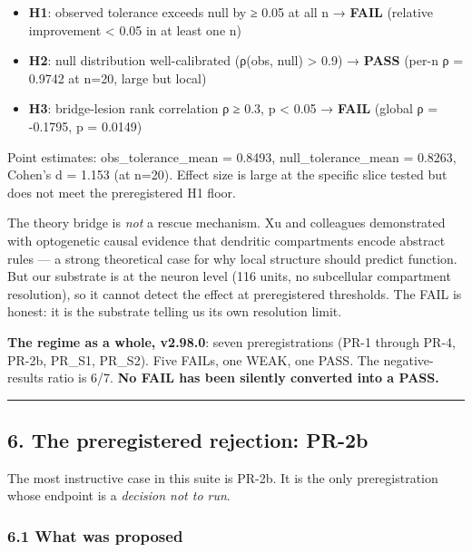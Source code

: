 \documentclass[
]{article}
\providecommand{\tightlist}{%
  \setlength{\itemsep}{0pt}\setlength{\parskip}{0pt}}
\begin{document}
\begin{itemize}
\tightlist
\item
  \textbf{H1}: observed tolerance exceeds null by ≥ 0.05 at all n →
  \textbf{FAIL} (relative improvement \textless{} 0.05 in at least one
  n)
\item
  \textbf{H2}: null distribution well-calibrated (\textbar ρ(obs,
  null)\textbar{} \textgreater{} 0.9) → \textbf{PASS} (per-n ρ = 0.9742
  at n=20, large but local)
\item
  \textbf{H3}: bridge-lesion rank correlation \textbar ρ\textbar{} ≥
  0.3, p \textless{} 0.05 → \textbf{FAIL} (global ρ = -0.1795, p =
  0.0149)
\end{itemize}

Point estimates: obs\_tolerance\_mean = 0.8493, null\_tolerance\_mean =
0.8263, Cohen's d = 1.153 (at n=20). Effect size is large at the
specific slice tested but does not meet the preregistered H1 floor.

The \citet{ref07} theory bridge is \emph{not} a rescue mechanism. Xu and
colleagues demonstrated with optogenetic causal evidence that dendritic
compartments encode abstract rules --- a strong theoretical case for why
local structure should predict function. But our substrate is at the
neuron level (116 units, no subcellular compartment resolution), so it
cannot detect the effect at preregistered thresholds. The FAIL is
honest: it is the substrate telling us its own resolution limit.

\textbf{The regime as a whole, v2.98.0}: seven preregistrations (PR-1
through PR-4, PR-2b, PR\_S1, PR\_S2). Five FAILs, one WEAK, one PASS.
The negative-results ratio is 6/7. \textbf{No FAIL has been silently
converted into a PASS.}

\begin{center}\rule{0.5\linewidth}{0.5pt}\end{center}

\subsection{6. The preregistered rejection:
PR-2b}\label{the-preregistered-rejection-pr-2b}

The most instructive case in this suite is PR-2b. It is the only
preregistration whose endpoint is a \emph{decision not to run}.

\subsubsection{6.1 What was proposed}\label{what-was-proposed}
\end{document}
